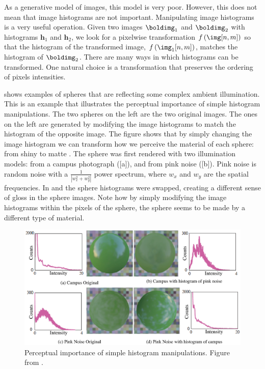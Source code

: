 As a generative model of images, this model is very poor. However, this does not mean that image histograms are not important. Manipulating image histograms is a very useful operation.  Given two images $\boldimg_1$ and $\boldimg_2$ with histograms $\mathbf{h}_1$ and $\mathbf{h}_2$, we look for a pixelwise transformation $f\left(\img [n,m] \right)$ so that the histogram of the transformed image, $f\left(\img_1 [n,m] \right)$, matches the histogram of $\boldimg_2$. There are many ways in which histograms can be transformed. One natural choice is a transformation that preserves the ordering of pixels intensities. 

\Fig{\ref{fig:illumination}} shows examples of spheres that are reflecting some complex ambient illumination.  This is an example that illustrates the perceptual importance of simple histogram manipulations. The two spheres on the left are the two original images. The ones on the left are generated by modifying the image histograms to match the histogram of the opposite image.  The figure shows that by simply changing the image histogram we can transform how we perceive the material of each sphere: from shiny to matte \cite{Fleming2001}.
The sphere was first rendered with two illumination models: from a campus photograph (\fig{\ref{fig:illumination}}[a]), and from pink noise (\fig{\ref{fig:illumination}}[b]). 
Pink noise is random noise with a $\frac{1}{|w_x^2+w_y^2|}$ power spectrum, where $w_x$ and $w_y$ are the spatial frequencies.  In  and  the sphere histograms were swapped, creating a different sense of gloss in the sphere images. Note how by simply modifying the image histograms within the pixels of the sphere, the sphere seems to be made by a different type of material. 


\begin{figure}
\centerline{
\includegraphics[width=1\linewidth]{figures/statistical_image_models/illuminationHistograms.eps}
} 
\caption{Perceptual importance of simple histogram manipulations. Figure from \cite{Fleming2001}.} 
\label{fig:illumination}
\end{figure}
%
%
%
%

